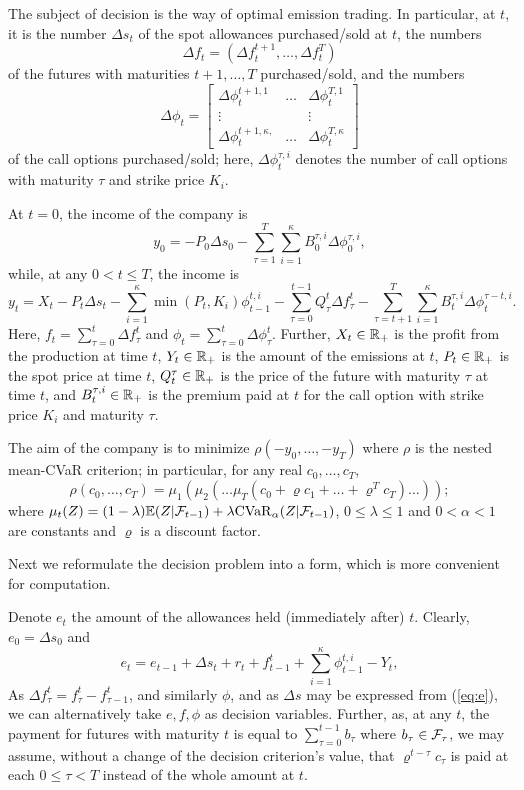 \documentclass[3p,times]{elsarticle}
\begin{document}
The subject of decision is the way of optimal emission trading. In particular, at $t$, it is the number $\Delta s_{t}$ of
the spot allowances purchased/sold at $t$, the numbers $$\Delta f_{t}=(\Delta f_{t}^{t+1},\dots,\Delta f_{t}^{T})$$
of the futures with maturities $t+1,\dots,T$ purchased/sold, and the numbers 
\[
\Delta \phi_{t}=\left[\begin{array}{ccc}
\Delta \phi_{t}^{t+1,1} & \dots & \Delta \phi_{t}^{T,1}\\
\vdots &  & \vdots\\
\Delta \phi_{t}^{t+1,\kappa,} & \dots & \Delta \phi_{t}^{T,\kappa}
\end{array}\right]
\]
of the call options purchased/sold; here, $\Delta \phi_t^{\tau,i}$ denotes the number of call options with maturity $\tau$ and strike price $K_i$.

At $t=0$, the income of the company is
$$
y_0=-P_0\Delta s_0- \sum_{\tau=1}^{T}\sum_{i=1}^{\kappa}B_0^{\tau,i}\Delta \phi_0^{\tau,i},
$$
while, at any $0<t\leq T$, the income is
$$
y_t  =X_t-P_t \Delta s_t-\sum_{i=1}^{\kappa}\min(P_t,K_{i})\phi_{t-1}^{t,i}
-\sum_{\tau=0}^{t-1}Q_{\tau}^{t}\Delta f_{\tau}^t-\sum_{\tau=t+1}^{T}\sum_{i=1}^{\kappa}B_t^{\tau,i}\Delta\phi_t^{\tau-t,i}.
$$
Here, $f_t=\sum_{\tau=0}^t \Delta f^t_\tau$ and 
$\phi_t=\sum_{\tau=0}^t \Delta \phi_\tau^t$. Further, $X_t\in \mathbb{R}_+$ is the profit from the production at time $t$, $Y_t \in \mathbb{R}_+$ is the amount of the emissions at $t$, $P_t\in\mathbb{R}_{+}$ is the spot price at time $t$, $Q_t^\tau \in \mathbb{R}_+$ is the price of the future with maturity $\tau$ at time $t$, and $B_t^{\tau,i}\in \mathbb{R}_+$ is the premium paid at $t$ for the call option with strike price $K_i$ and maturity $\tau$. 

The aim of the company is to minimize $\rho(-y_0,\dots,-y_T)$
where $\rho$ is the nested mean-CVaR criterion; in particular, for any real $c_0,\dots,c_T$,
$$
\rho(c_0,\dots,c_T)=\mu_1(\mu_2(\dots\mu_T(c_0+\varrho c_1+\dots+\varrho ^ T c_T)\dots));
$$
where $\mu_t(Z)=(1-\lambda)\mathbb{E}(Z|\mathcal{F}_{t-1})+\lambda \mathrm{CVaR}_\alpha(Z|\mathcal{F}_{t-1})$, $0\leq \lambda \leq 1$ and $0<\alpha<1$ are constants and $\varrho$ is a discount factor.

Next we reformulate the decision problem into a form, which is more convenient for computation. 

Denote $e_t$ the amount of the allowances held (immediately after) $t$. Clearly, $e_0=\Delta s_0$ and 
\begin{equation}\label{eq:e}
e_t = e_{t-1}+\Delta s_t+r_t +
f_{t-1}^t+\sum_{i=1}^{\kappa}\phi_{t-1}^{t,i}-Y_t,
\end{equation}
As $\Delta f^t_\tau=f^t_\tau-f^t_{\tau-1}$, and similarly $\phi$, and as $\Delta s$ may be expressed from (\ref{eq:e}), we can alternatively take $e,f,\phi$ as decision variables. Further, as, at any $t$, the payment for futures with maturity $t$ is equal to $\sum_{\tau=0}^{t-1} b_\tau$ where $b_\tau \in  \mathcal{F}_\tau$, we may assume, without a change of the decision criterion's value, that $\varrho^{t-\tau}c_\tau$ is paid at each $0\leq \tau < T$ instead of the whole amount at $t$.
\end{document}

